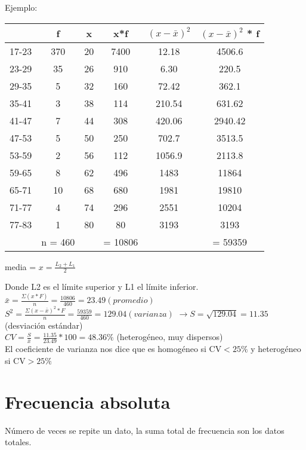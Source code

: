 \documentclass[letterpaper,12pt]{article}
\begin{document}
Ejemplo: 
\begin{table}[H]
    \centering
    \begin{tabular}{|c|c|c|c|c|c|} \hline
                 & f & x & x*f & $(x -\bar{x})^2$ & $(x -\bar{x})^2$ * f \\ \hline
           17-23 & 370 & 20 & 7400 & 12.18  & 4506.6\\ \hline
           23-29 & 35  & 26 & 910  & 6.30   & 220.5\\\hline
           29-35 & 5   & 32 & 160  & 72.42  & 362.1 \\\hline
           35-41 & 3   & 38 & 114  & 210.54 & 631.62\\\hline
           41-47 & 7   & 44 & 308  & 420.06 & 2940.42\\\hline
           47-53 & 5   & 50 & 250  & 702.7  & 3513.5 \\\hline
           53-59 & 2   & 56 & 112  & 1056.9 & 2113.8 \\\hline
           59-65 & 8   & 62 & 496  & 1483   & 11864 \\\hline
           65-71 & 10  & 68 & 680  & 1981   & 19810 \\\hline
           71-77 & 4   & 74 & 296  & 2551   & 10204 \\\hline
           77-83 & 1   & 80 & 80   & 3193   & 3193 \\ \hline
                 & n = 460 &  & = 10806 & & = 59359
    \end{tabular}
\end{table}
media = $\displaystyle x = \frac{L_2+L_1}{2}$

Donde L2 es el límite superior y L1 el límite inferior. 
\vspace{0.3cm}\\
$\displaystyle \bar{x} = \frac{\Sigma (x * F)}{n} = \frac{10806}{460} = 23.49 (promedio)$
\vspace{0.3cm}\\
$\displaystyle S^{2} = \frac{\Sigma (x-\bar{x})^2 * F}{n} = \frac{59359}{460} = 129.04 (varianza)$
$ \longrightarrow S = \sqrt{129.04}  = 11.35$ (desviación estándar)
\vspace{0.3cm}\\
$\displaystyle CV = \frac{S}{\bar{x}} = \frac{11.35}{23.49} * 100 = 48.36\%$ (heterogéneo, muy dispersos)
\vspace{0.3cm}\\
El coeficiente de varianza nos dice que es homogéneo si CV$< 25\%$ y heterogéneo si CV$> 25\%$ 

\section{Frecuencia absoluta}
Número de veces se repite un dato, la suma total de frecuencia son los datos totales. 
\end{document}
